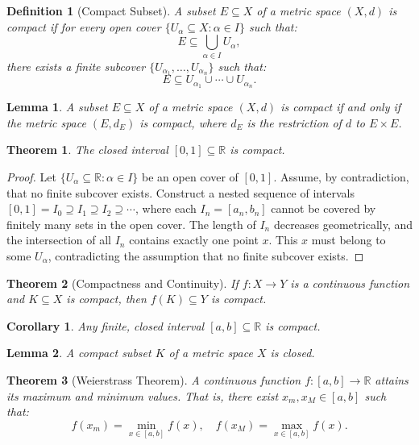 \documentclass{article}
\newtheorem{definition}{Definition}
\newtheorem{lemma}{Lemma}
\newtheorem{theorem}{Theorem}
\newtheorem{corollary}{Corollary}
\begin{document}
\begin{definition}[Compact Subset]
A subset $E \subseteq X$ of a metric space $(X, d)$ is compact if for every open cover $\{U_\alpha \subseteq X : \alpha \in I\}$ such that:
\[
E \subseteq \bigcup_{\alpha \in I} U_\alpha,
\]
there exists a finite subcover $\{U_{\alpha_1}, \ldots, U_{\alpha_n}\}$ such that:
\[
E \subseteq U_{\alpha_1} \cup \cdots \cup U_{\alpha_n}.
\]
\end{definition}

\begin{lemma}
A subset $E \subseteq X$ of a metric space $(X, d)$ is compact if and only if the metric space $(E, d_E)$ is compact, where $d_E$ is the restriction of $d$ to $E \times E$.
\end{lemma}

\begin{theorem}
The closed interval $[0, 1] \subseteq \mathbb{R}$ is compact.
\end{theorem}

\begin{proof}
Let $\{U_\alpha \subseteq \mathbb{R} : \alpha \in I\}$ be an open cover of $[0, 1]$. Assume, by contradiction, that no finite subcover exists. Construct a nested sequence of intervals $[0, 1] = I_0 \supseteq I_1 \supseteq I_2 \supseteq \cdots$, where each $I_n = [a_n, b_n]$ cannot be covered by finitely many sets in the open cover. The length of $I_n$ decreases geometrically, and the intersection of all $I_n$ contains exactly one point $x$. This $x$ must belong to some $U_\alpha$, contradicting the assumption that no finite subcover exists.
\end{proof}

\begin{theorem}[Compactness and Continuity]
If $f : X \to Y$ is a continuous function and $K \subseteq X$ is compact, then $f(K) \subseteq Y$ is compact.
\end{theorem}

\begin{corollary}
Any finite, closed interval $[a, b] \subseteq \mathbb{R}$ is compact.
\end{corollary}

\begin{lemma}
A compact subset $K$ of a metric space $X$ is closed.
\end{lemma}

\begin{theorem}[Weierstrass Theorem]
A continuous function $f : [a, b] \to \mathbb{R}$ attains its maximum and minimum values. That is, there exist $x_m, x_M \in [a, b]$ such that:
\[
f(x_m) = \min_{x \in [a, b]} f(x), \quad f(x_M) = \max_{x \in [a, b]} f(x).
\]
\end{theorem}
\end{document}
